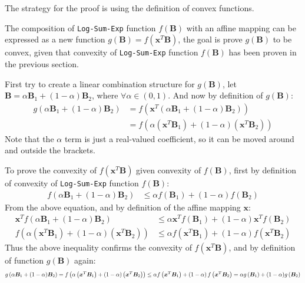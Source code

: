 \documentclass[12pt]{article}
\newcommand*{\Scale}[2][4]{\scalebox{#1}{$#2$}}%
\numberwithin{equation}{section}
\theoremstyle{remark}
\newcommand{\vect}[1]{\boldsymbol{#1}}
\begin{document}
\medskip
The strategy for the proof is using the definition of convex functions.

\medskip
The composition of \texttt{Log-Sum-Exp} function $f(\vect{B})$ with an affine mapping can be expressed as a new function $g(\vect{B}) = f(\vect{x}^{T}\vect{B})$, the goal is prove $g(\vect{B})$ to be convex, given that convexity of \texttt{Log-Sum-Exp} function $f(\vect{B})$ has been proven in the previous section.

\medskip
First try to create a linear combination structure for $g(\vect{B})$, let $\vect{B} = \alpha\vect{B}_{1} + (1-\alpha)\vect{B}_{2}$, where $\forall \alpha \in (0, 1)$. And now by definition of $g(\vect{B})$:
\begin{align}
g\left(\alpha\vect{B}_{1} + (1-\alpha)\vect{B}_{2}\right)&= f\left(\vect{x}^{T}\left(\alpha\vect{B}_{1} + (1-\alpha)\vect{B}_{2}\right)\right) \\
&= f\left(\alpha\left(\vect{x}^{T}\vect{B}_{1}\right) + \left(1 - \alpha\right)\left(\vect{x}^{T}\vect{B}_{2}\right)\right)
\end{align}
Note that the $\alpha$ term is just a real-valued coefficient, so it can be moved around and outside the brackets. 

\medskip
To prove the convexity of $f(\vect{x}^{T}\vect{B})$ given convexity of $f(\vect{B})$, first by definition of convexity of \texttt{Log-Sum-Exp} function $f(\vect{B})$:
\begin{align}
f\left(\alpha \vect{B}_{1} + (1 - \alpha )\vect{B}_{2} \right) &\leq \alpha f \left(\vect{B}_{1}\right) + \left(1 - \alpha\right) f \left(\vect{B}_{2}\right)
\end{align}
From the above equation, and by definition of the affine mapping $\vect{x}$:
\begin{align}
\vect{x}^{T} f\left(\alpha \vect{B}_{1} + (1 - \alpha )\vect{B}_{2} \right) &\leq \alpha \vect{x}^{T} f \left(\vect{B}_{1}\right) + \left(1 - \alpha\right) \vect{x}^{T} f \left(\vect{B}_{2}\right) \\
f\left(\alpha\left(\vect{x}^{T}\vect{B}_{1}\right) + \left(1 - \alpha\right)\left(\vect{x}^{T}\vect{B}_{2}\right)\right) &\leq \alpha f \left(\vect{x}^{T}\vect{B}_{1}\right) + \left(1 - \alpha\right) f \left(\vect{x}^{T}\vect{B}_{2}\right)
\end{align}
Thus the above inequality confirms the convexity of $f(\vect{x}^{T}\vect{B})$, and by definition of function $g(\vect{B})$ again:
%
\[\Scale[0.85]{g\left(\alpha\vect{B}_{1} + (1-\alpha)\vect{B}_{2}\right) = f\left(\alpha\left(\vect{x}^{T}\vect{B}_{1}\right) + \left(1 - \alpha\right)\left(\vect{x}^{T}\vect{B}_{2}\right)\right) \leq \alpha f \left(\vect{x}^{T}\vect{B}_{1}\right) + \left(1 - \alpha\right) f \left(\vect{x}^{T}\vect{B}_{2}\right) = \alpha g\left(\vect{B}_{1}\right) + (1 - \alpha )g\left(\vect{B}_{2}\right)}\] 
%
\end{document}
